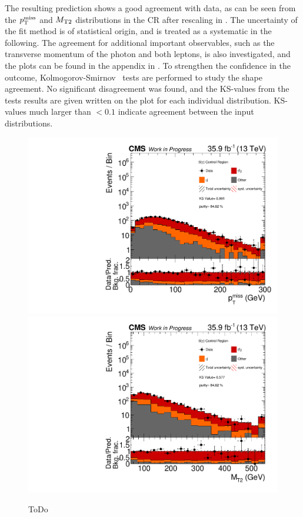 The resulting prediction shows a good agreement with data, as can be seen from the $p_{\mathrm{T}}^\text{miss}$ and $M_{\mathrm{T2}}$ distributions in the CR after rescaling in . The uncertainty of the fit method is of statistical origin, and is treated as a systematic in the following. The agreement for additional important observables, such as the transverse momentum of the photon and both leptons, is also investigated, and the plots can be found in the appendix in . To strengthen the confidence in the outcome, Kolmogorov-Smirnov~\cite{KS} tests are performed to study the shape agreement. No significant disagreement was found, and the KS-values from the tests results are given written on the plot for each individual distribution. KS-values much larger than $<0.1$ indicate agreement between the input distributions.\\
\begin{figure}[tbp]
 \centering
 \includegraphics[width=\pairwidth]{figures/plots_CR_tt/CRTT_EM_nom_met_log}
 \includegraphics[width=\pairwidth]{figures/plots_CR_tt/CRTT_EM_nom_mt2_log}
 \caption{ToDo}
 \label{fig:CRTT}
\end{figure}
